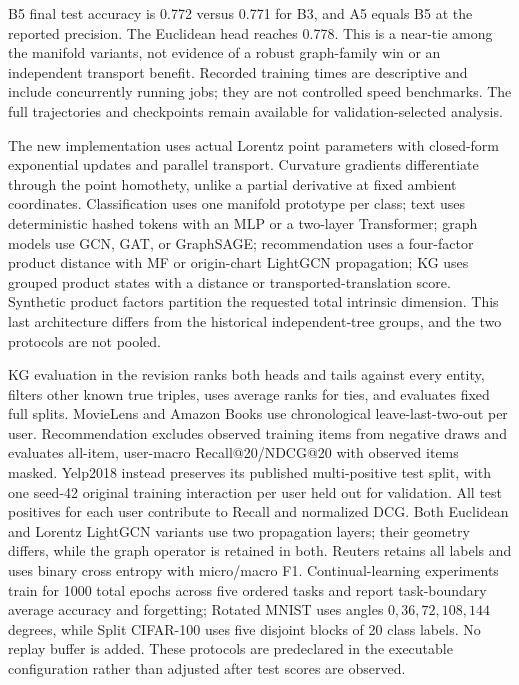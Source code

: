 B5 final test accuracy is 0.772 versus 0.771 for B3, and A5 equals B5 at the reported precision. The Euclidean head reaches 0.778. This is a near-tie among the manifold variants, not evidence of a robust graph-family win or an independent transport benefit. Recorded training times are descriptive and include concurrently running jobs; they are not controlled speed benchmarks. The full trajectories and checkpoints remain available for validation-selected analysis.

The new implementation uses actual Lorentz point parameters with closed-form exponential updates and parallel transport. Curvature gradients differentiate through the point homothety, unlike a partial derivative at fixed ambient coordinates. Classification uses one manifold prototype per class; text uses deterministic hashed tokens with an MLP or a two-layer Transformer; graph models use GCN, GAT, or GraphSAGE; recommendation uses a four-factor product distance with MF or origin-chart LightGCN propagation; KG uses grouped product states with a distance or transported-translation score. Synthetic product factors partition the requested total intrinsic dimension. This last architecture differs from the historical independent-tree groups, and the two protocols are not pooled.

KG evaluation in the revision ranks both heads and tails against every entity, filters other known true triples, uses average ranks for ties, and evaluates fixed full splits. MovieLens and Amazon Books use chronological leave-last-two-out per user. Recommendation excludes observed training items from negative draws and evaluates all-item, user-macro Recall@20/NDCG@20 with observed items masked. Yelp2018 instead preserves its published multi-positive test split, with one seed-42 original training interaction per user held out for validation. All test positives for each user contribute to Recall and normalized DCG. Both Euclidean and Lorentz LightGCN variants use two propagation layers; their geometry differs, while the graph operator is retained in both. Reuters retains all labels and uses binary cross entropy with micro/macro F1. Continual-learning experiments train for 1000 total epochs across five ordered tasks and report task-boundary average accuracy and forgetting; Rotated MNIST uses angles $0,36,72,108,144$ degrees, while Split CIFAR-100 uses five disjoint blocks of 20 class labels. No replay buffer is added. These protocols are predeclared in the executable configuration rather than adjusted after test scores are observed.

